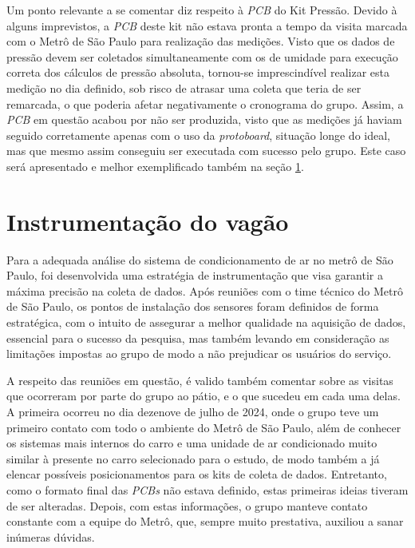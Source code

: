 \documentclass[acronym,symbols,table]{fei}
\begin{document}
Um ponto relevante a se comentar diz respeito à \textit{PCB} do Kit Pressão. Devido à alguns imprevistos, a \textit{PCB} deste kit não estava pronta a tempo da visita marcada com o Metrô de São Paulo para realização das medições. Visto que os dados de pressão devem ser coletados simultaneamente com os de umidade para execução correta dos cálculos de pressão absoluta, tornou-se imprescindível realizar esta medição no dia definido, sob risco de atrasar uma coleta que teria de ser remarcada, o que poderia afetar negativamente o cronograma do grupo. Assim, a \textit{PCB} em questão acabou por não ser produzida, visto que as medições já haviam seguido corretamente apenas com o uso da \textit{protoboard}, situação longe do ideal, mas que mesmo assim conseguiu ser executada com sucesso pelo grupo. Este caso será apresentado e melhor exemplificado também na seção \ref{instruvagao}.


\section{Instrumentação do vagão} \label{instruvagao}

Para a adequada análise do sistema de condicionamento de ar no metrô de São Paulo, foi desenvolvida uma estratégia de instrumentação que visa garantir a máxima precisão na coleta de dados. Após reuniões com o time técnico do Metrô de São Paulo, os pontos de instalação dos sensores foram definidos de forma estratégica, com o intuito de assegurar a melhor qualidade na aquisição de dados, essencial para o sucesso da pesquisa, mas também levando em consideração as limitações impostas ao grupo de modo a não prejudicar os usuários do serviço.

A respeito das reuniões em questão, é valido também comentar sobre as visitas que ocorreram por parte do grupo ao pátio, e o que sucedeu em cada uma delas. A primeira ocorreu no dia dezenove de julho de 2024, onde o grupo teve um primeiro contato com todo o ambiente do Metrô de São Paulo, além de conhecer os sistemas mais internos do carro e uma unidade de ar condicionado muito similar à presente no carro selecionado para o estudo, de modo também a já elencar possíveis posicionamentos para os kits de coleta de dados. Entretanto, como o formato final das \textit{PCBs} não estava definido, estas primeiras ideias tiveram de ser alteradas. Depois, com estas informações, o grupo manteve contato constante com a equipe do Metrô, que, sempre muito prestativa, auxiliou a sanar inúmeras dúvidas.
\end{document}
